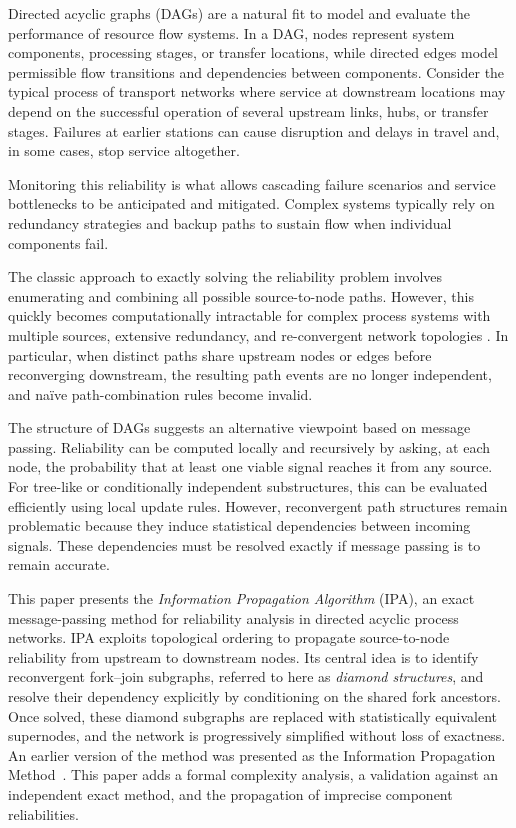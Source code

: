\documentclass[preprint,12pt]{elsarticle}
\begin{document}
Directed acyclic graphs (DAGs) are a natural fit to model and evaluate the performance of resource flow systems. In a DAG, nodes represent system components, processing stages, or transfer locations, while directed edges model permissible flow transitions and dependencies between components. Consider the typical process of transport networks where service at downstream locations may depend on the successful operation of several upstream links, hubs, or transfer stages. Failures at earlier stations can cause disruption and delays in travel and, in some cases, stop service altogether.

Monitoring this reliability is what allows cascading failure scenarios and service bottlenecks to be anticipated and mitigated. Complex systems typically rely on redundancy strategies and backup paths to sustain flow when individual components fail.

The classic approach to exactly solving the reliability problem involves enumerating and combining all possible source-to-node paths. However, this quickly becomes computationally intractable for complex process systems with multiple sources, extensive redundancy, and re-convergent network topologies \cite{george-williams_simulation_2021}. In particular, when distinct paths share upstream nodes or edges before reconverging downstream, the resulting path events are no longer independent, and naïve path-combination rules become invalid.

The structure of DAGs suggests an alternative viewpoint based on message passing. Reliability can be computed locally and recursively by asking, at each node, the probability that at least one viable signal reaches it from any source. For tree-like or conditionally independent substructures, this can be evaluated efficiently using local update rules. However, reconvergent path structures remain problematic because they induce statistical dependencies between incoming signals. These dependencies must be resolved exactly if message passing is to remain accurate.

This paper presents the \emph{Information Propagation Algorithm} (IPA), an exact message-passing method for reliability analysis in directed acyclic process networks. IPA exploits topological ordering to propagate source-to-node reliability from upstream to downstream nodes. Its central idea is to identify reconvergent fork--join subgraphs, referred to here as \emph{diamond structures}, and resolve their dependency explicitly by conditioning on the shared fork ancestors. Once solved, these diamond subgraphs are replaced with statistically equivalent supernodes, and the network is progressively simplified without loss of exactness. An earlier version of the method was presented as the Information Propagation Method~\cite{ohiani_information_2023}. This paper adds a formal complexity analysis, a validation against an independent exact method, and the propagation of imprecise component reliabilities.
\end{document}
